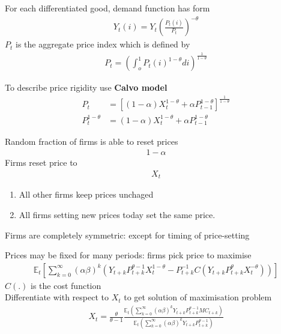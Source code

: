 \documentclass{beamer}
\begin{document}
\begin{frame}
 For each differentiated good, demand function has form 
\begin{align}
  Y_t(i)=Y_t \left( \frac{P_t(i)}{P_t}\right)^{-\theta}
\end{align}
\medskip
$P_t$ is the aggregate price index which is defined by
\begin{align}
  P_t=\left( \int_o^1 P_t(i)^{1-\theta}di \right)^{\frac{1}{1-\theta}}
\end{align}  
\end{frame}

\begin{frame}
 To describe price rigidity use \textbf{Calvo model}\\ 
\begin{align}
  P_t &= \left[(1-\alpha)X_t^{1-\theta} + \alpha P_{t-1}^{1-\theta} \right] ^{\frac{1}{1-\theta}}\\ \nonumber
  P_t^{1-\theta} &= (1-\alpha)X_t^{1-\theta} + \alpha P_{t-1}^{1-\theta}
\end{align}
\end{frame}

\begin{frame}
Random fraction of firms is able to reset prices
\begin{align}
   1-\alpha 
\end{align}
Firms reset price to 
\begin{align}
   X_t 
\end{align}
\begin{enumerate}
  \item All other firms keep prices unchaged
  \item All firms setting new prices today set the same price.
\end{enumerate}
\medskip
 Firms are completely symmetric: except for timing of price-setting
\end{frame}

\begin{frame}
 Prices may be fixed for many periods: firms pick price to maximise
\begin{align}
  \mathbb{E}_t \left[ \sum_{k=0}^{\infty} (\alpha \beta)^k (Y_{t+k}P_{t+k}^{\theta-1}X_t^{1-\theta} -
  P_{t+k}^{-1}C (Y_{t+k}P_{t+k}^{\theta}X_t^{-\theta}) ) \right]
\end{align}
$C(.)$ is the cost function\\
Differentiate with respect to $X_t$ to get solution of maximisation problem
\begin{align}
  X_t = \frac{\theta}{\theta-1} \frac{\mathbb{E}_t \left(\sum_{k=0}^{\infty}(\alpha \beta)^k Y_{t+k}P_{t+k}^{\theta-1}MC_{t+k} \right)}
  {\mathbb{E}_t \left(\sum_{k=0}^{\infty}(\alpha \beta)^k Y_{t+k}P_{t+k}^{\theta-1} \right) }
\end{align}  
\end{frame}
\end{document}

